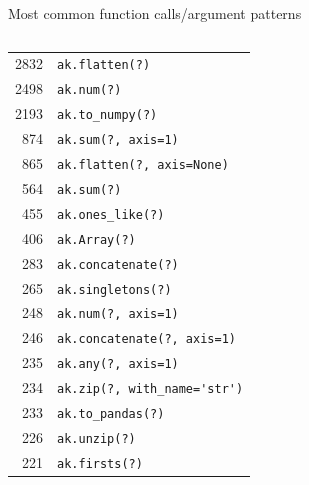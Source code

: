 \documentclass[aspectratio=169]{beamer}
\begin{document}
\begin{frame}[fragile]{Most common function calls/argument patterns}
\vspace{0.3 cm}
\small
\begin{columns}
\mbox{\hspace{1.35 cm}{\large\bf Awkward Array}}

\vspace{0.05 cm}
\begin{tabular}{r l}
2832 & \verb|ak.flatten(?)| \\
2498 & \verb|ak.num(?)| \\
2193 & \verb|ak.to_numpy(?)| \\
 874 & \verb|ak.sum(?, axis=1)| \\
 865 & \verb|ak.flatten(?, axis=None)| \\
 564 & \verb|ak.sum(?)| \\
 455 & \verb|ak.ones_like(?)| \\
 406 & \verb|ak.Array(?)| \\
 283 & \verb|ak.concatenate(?)| \\
 265 & \verb|ak.singletons(?)| \\
 248 & \verb|ak.num(?, axis=1)| \\
 246 & \verb|ak.concatenate(?, axis=1)| \\
 235 & \verb|ak.any(?, axis=1)| \\
 234 & \verb|ak.zip(?, with_name='str')| \\
 233 & \verb|ak.to_pandas(?)| \\
 226 & \verb|ak.unzip(?)| \\
 221 & \verb|ak.firsts(?)| \\
\end{tabular}

\mbox{\hspace{1.35 cm}{\large\bf Uproot}}


\end{columns}
\end{frame}
\end{document}
